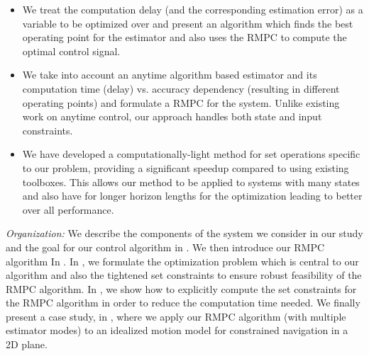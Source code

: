 \begin{itemize}
\item We treat the computation delay (and the corresponding estimation error) as a variable to be optimized over and present an algorithm which finds the best operating point for the estimator and also uses the RMPC to compute the optimal control signal.
	\item We take into account an anytime algorithm based estimator and its computation time (delay) vs. accuracy dependency (resulting in different operating points) and formulate a RMPC for the system. Unlike existing work on anytime control, our approach handles both state and input constraints.
	\item We have developed a computationally-light method for set operations specific to our problem, providing a significant speedup compared to using existing toolboxes. This allows our method to be applied to systems with many states and also have for longer horizon lengths for the optimization leading to better over all performance.
\end{itemize}

\noindent\emph{Organization:} We describe the components of the system we consider in our study and the goal for our control algorithm in  . We then introduce our RMPC algorithm In . In , we formulate the optimization problem which is central to our algorithm and also the tightened set constraints to ensure robust feasibility of the RMPC algorithm. In , we show how to explicitly compute the set constraints for the RMPC algorithm in order to reduce the computation time needed. %
We finally present a case study, in ,  where we apply our RMPC algorithm (with multiple estimator modes) to an idealized motion model for constrained navigation in a 2D plane. 


